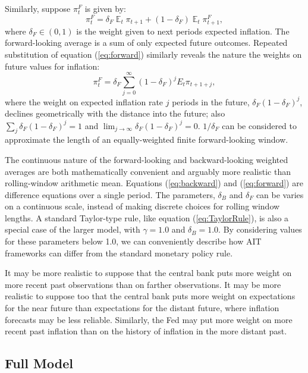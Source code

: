 \documentclass[english,authoryear,12pt]{elsarticle}
\DeclareMathOperator{\E}{\mathbb{E}}
\begin{document}
Similarly, suppose $\pi_t^F$ is given by:
\begin{equation}\label{eq:forward}
	\pi_t^F = \delta_F \E_t \pi_{t+1} + (1-\delta_F) \E_t \pi_{t+1}^F,
\end{equation}
where $\delta_F \in (0,1)$ is the weight given to next periods expected inflation. The forward-looking average is a sum of only expected future outcomes. Repeated substitution of equation (\ref{eq:forward}) similarly reveals the nature the weights on future values for inflation:
\begin{equation}\label{eq:forward_all}
	\pi_t^F = \delta_F \sum_{j=0}^{\infty} (1-\delta_F)^j E_t \pi_{t+1+j},
\end{equation}
where the weight on expected inflation rate $j$ periods in the future, $\delta_F (1-\delta_F)^{j}$, declines geometrically with the distance into the future; also $\sum_j \delta_F (1-\delta_F)^{j}=1$ and $\lim_{j \to \infty} \delta_F (1-\delta_F)^j=0$. $1/ \delta_F$ can be considered to approximate the length of an equally-weighted finite forward-looking window.

The continuous nature of the forward-looking and backward-looking weighted averages are both mathematically convenient and arguably more realistic than rolling-window arithmetic mean. Equations (\ref{eq:backward}) and (\ref{eq:forward}) are difference equations over a single period. The parameters, $\delta_B$ and $\delta_F$ can be varies on a continuous scale, instead of making discrete choices for rolling window lengths. A standard Taylor-type rule, like equation (\ref{eq:TaylorRule}), is also a special case of the larger model, with $\gamma=1.0$ and $\delta_B=1.0$. By considering values for these parameters below 1.0, we can conveniently describe how AIT frameworks can differ from the standard monetary policy rule.

It may be more realistic to suppose that the central bank puts more weight on more recent past observations than on farther observations. It may be more realistic to suppose too that the central bank puts more weight on expectations for the near future than expectations for the distant future, where inflation forecasts may be less reliable. Similarly, the Fed may put more weight on more recent past inflation than on the history of inflation in the more distant past.

\subsection{Full Model}
\end{document}
